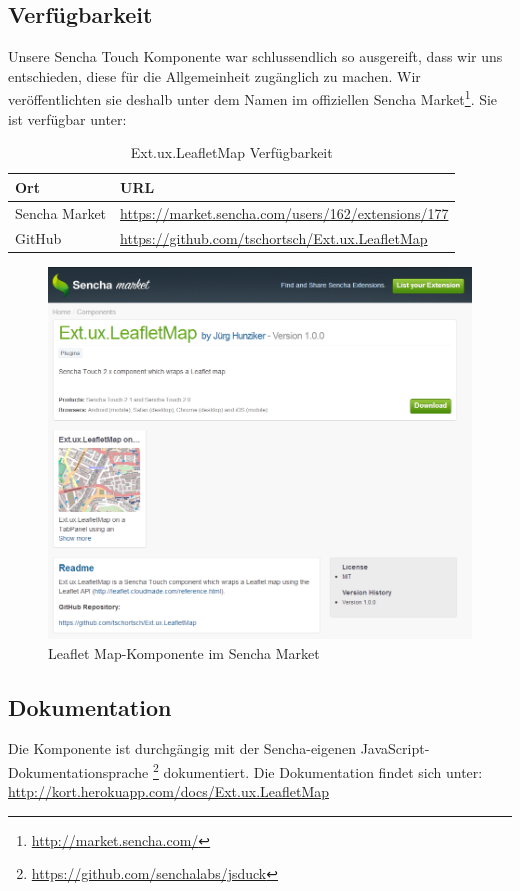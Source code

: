 \subsection{Verfügbarkeit}
Unsere Sencha Touch Komponente war schlussendlich so ausgereift, dass wir uns entschieden, diese für die Allgemeinheit zugänglich zu machen.
Wir veröffentlichten sie deshalb unter dem Namen  im offiziellen Sencha Market\footnote{\url{http://market.sencha.com/}}.
Sie ist verfügbar unter:

\begin{table}[H]
\centering
\begin{tabular}{|p{0.2\twocelltabwidth}|p{0.8\twocelltabwidth}|}
\hline 
\textbf{Ort} & \textbf{URL} \\ 
\hline 
Sencha Market & \url{https://market.sencha.com/users/162/extensions/177} \\ 
\hline 
GitHub & \url{https://github.com/tschortsch/Ext.ux.LeafletMap} \\ 
\hline 
\end{tabular} 
\caption{Ext.ux.LeafletMap Verfügbarkeit}
\label{leafletmap-availiblity}
\end{table}

\begin{figure}[H]
	\centering
	\includegraphics[scale=0.6]{images/implementation/frontend/leafletmap-sencha-market}
	\caption{Leaflet Map-Komponente im Sencha Market}
	\label{image-leafletmap-sencha-market}
\end{figure}

\subsection{Dokumentation}
Die Komponente ist durchgängig mit der Sencha-eigenen JavaScript-Dokumentationsprache \footnote{\url{https://github.com/senchalabs/jsduck}} dokumentiert. Die Dokumentation findet sich unter: \url{http://kort.herokuapp.com/docs/Ext.ux.LeafletMap}